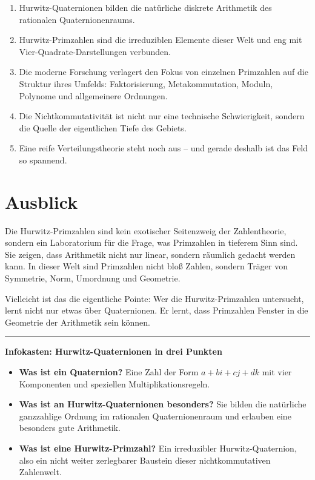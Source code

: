 \documentclass[11pt,a4paper]{article}
\begin{document}
	\begin{enumerate}[leftmargin=1.5em]
		\item Hurwitz-Quaternionen bilden die natürliche diskrete Arithmetik des rationalen Quaternionenraums.
		\item Hurwitz-Primzahlen sind die irreduziblen Elemente dieser Welt und eng mit Vier-Quadrate-Darstellungen verbunden.
		\item Die moderne Forschung verlagert den Fokus von einzelnen Primzahlen auf die Struktur ihres Umfelds: Faktorisierung, Metakommutation, Moduln, Polynome und allgemeinere Ordnungen.
		\item Die Nichtkommutativität ist nicht nur eine technische Schwierigkeit, sondern die Quelle der eigentlichen Tiefe des Gebiets.
		\item Eine reife Verteilungstheorie steht noch aus -- und gerade deshalb ist das Feld so spannend.
	\end{enumerate}
	
	\section*{Ausblick}
	
	Die Hurwitz-Primzahlen sind kein exotischer Seitenzweig der Zahlentheorie, sondern ein Laboratorium für die Frage, was Primzahlen in tieferem Sinn sind. Sie zeigen, dass Arithmetik nicht nur linear, sondern räumlich gedacht werden kann. In dieser Welt sind Primzahlen nicht bloß Zahlen, sondern Träger von Symmetrie, Norm, Umordnung und Geometrie.
	
	Vielleicht ist das die eigentliche Pointe: Wer die Hurwitz-Primzahlen untersucht, lernt nicht nur etwas über Quaternionen. Er lernt, dass Primzahlen Fenster in die Geometrie der Arithmetik sein können.
	
	\vspace{1em}
	\hrule
	\vspace{0.8em}
	
	\noindent\textbf{Infokasten: Hurwitz-Quaternionen in drei Punkten}
	
	\begin{itemize}[leftmargin=1.5em]
		\item \textbf{Was ist ein Quaternion?}  
		Eine Zahl der Form \(a+bi+cj+dk\) mit vier Komponenten und speziellen Multiplikationsregeln.
		
		\item \textbf{Was ist an Hurwitz-Quaternionen besonders?}  
		Sie bilden die natürliche ganzzahlige Ordnung im rationalen Quaternionenraum und erlauben eine besonders gute Arithmetik.
		
		\item \textbf{Was ist eine Hurwitz-Primzahl?}  
		Ein irreduzibler Hurwitz-Quaternion, also ein nicht weiter zerlegbarer Baustein dieser nichtkommutativen Zahlenwelt.
	\end{itemize}
	
\end{document}
